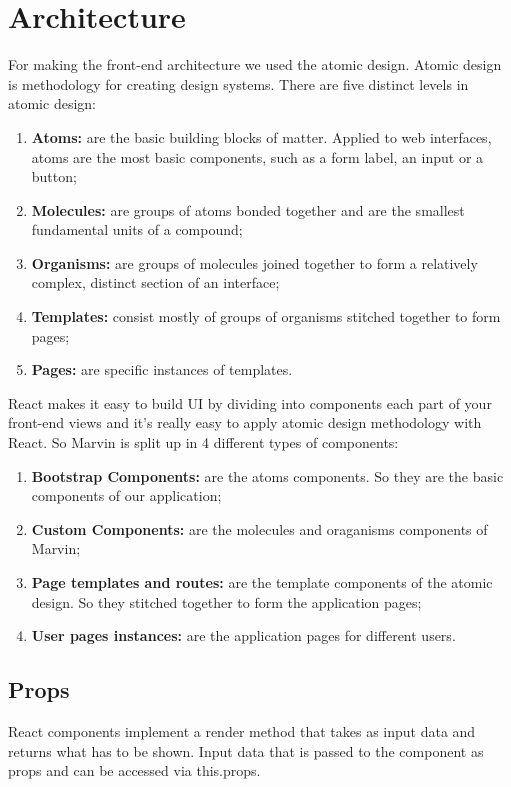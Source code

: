\documentclass[../react]{subfiles}
\begin{document}
	
	\section{Architecture}

	For making the front-end architecture we used the atomic design. Atomic design is methodology for creating design systems. There are five distinct levels in atomic design:
	\begin{enumerate} 
		\item \textbf{Atoms:} are the basic building blocks of matter. Applied to web interfaces, atoms are the most basic components, such as a form label, an input or a button;
		\item \textbf{Molecules:} are groups of atoms bonded together and are the smallest fundamental units of a compound;
		\item \textbf{Organisms:} are groups of molecules joined together to form a relatively complex, distinct section of an interface;
		\item \textbf{Templates:} consist mostly of groups of organisms stitched together to form pages;
		\item \textbf{Pages:} are specific instances of templates.
	\end{enumerate} 
	 React makes it easy to build UI by dividing into components each part of your front-end views and it's really easy to apply atomic design methodology with React.
	So Marvin is split up in 4 different types of components:
	\begin{enumerate} 
		\item \textbf{Bootstrap Components:} are the atoms components. So they are the basic components of our application;
		\item \textbf{Custom Components:} are the molecules and oraganisms components of Marvin;
		\item \textbf{Page templates and routes:} are the template components of the atomic design. So they stitched together to form the application pages;
		\item \textbf{User pages instances:} are the application pages for different users.
	\end{enumerate} 

	\subsection{Props}
	React components implement a render method that takes as input data and returns what has to be shown.
	Input data that is passed to the component as props and can be accessed via this.props.
\end{document}
